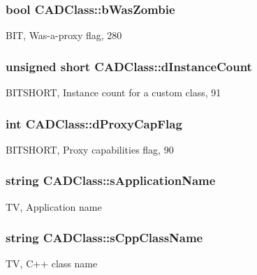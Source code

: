 \subsubsection[{\texorpdfstring{b\+Was\+Zombie}{bWasZombie}}]{\setlength{\rightskip}{0pt plus 5cm}bool C\+A\+D\+Class\+::b\+Was\+Zombie}\hypertarget{struct_c_a_d_class_ab628f145a66c99a6a892cc1056e55088}{}\label{struct_c_a_d_class_ab628f145a66c99a6a892cc1056e55088}
B\+IT, Was-\/a-\/proxy flag, 280 
\subsubsection[{\texorpdfstring{d\+Instance\+Count}{dInstanceCount}}]{\setlength{\rightskip}{0pt plus 5cm}unsigned short C\+A\+D\+Class\+::d\+Instance\+Count}\hypertarget{struct_c_a_d_class_abcf456bcb9c603da391bd7a10dde9344}{}\label{struct_c_a_d_class_abcf456bcb9c603da391bd7a10dde9344}
B\+I\+T\+S\+H\+O\+RT, Instance count for a custom class, 91 
\subsubsection[{\texorpdfstring{d\+Proxy\+Cap\+Flag}{dProxyCapFlag}}]{\setlength{\rightskip}{0pt plus 5cm}int C\+A\+D\+Class\+::d\+Proxy\+Cap\+Flag}\hypertarget{struct_c_a_d_class_a47022deef6fa84a4062e39a66c822ee2}{}\label{struct_c_a_d_class_a47022deef6fa84a4062e39a66c822ee2}
B\+I\+T\+S\+H\+O\+RT, Proxy capabilities flag, 90 
\subsubsection[{\texorpdfstring{s\+Application\+Name}{sApplicationName}}]{\setlength{\rightskip}{0pt plus 5cm}string C\+A\+D\+Class\+::s\+Application\+Name}\hypertarget{struct_c_a_d_class_a0526e446517876d44964dc2aa1e098bc}{}\label{struct_c_a_d_class_a0526e446517876d44964dc2aa1e098bc}
TV, Application name 
\subsubsection[{\texorpdfstring{s\+Cpp\+Class\+Name}{sCppClassName}}]{\setlength{\rightskip}{0pt plus 5cm}string C\+A\+D\+Class\+::s\+Cpp\+Class\+Name}\hypertarget{struct_c_a_d_class_acfca1558a652e86d0b3b73638e85da9a}{}\label{struct_c_a_d_class_acfca1558a652e86d0b3b73638e85da9a}
TV, C++ class name 
